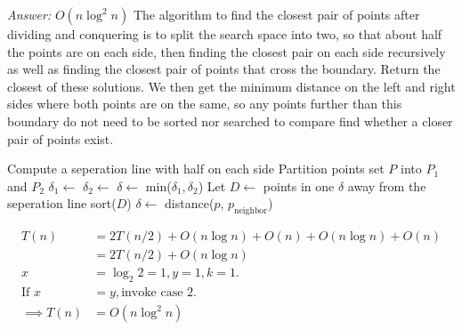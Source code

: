 \documentclass[12pt]{article}
\begin{document}
\textit{Answer:} $O(n \log^2 n)$
\newpage
The algorithm to find the closest pair of points after dividing and conquering is to split the search space into two, so that about half the points are on each side, then finding the closest pair on each side recursively as well as finding the closest pair of points that cross the boundary. Return the closest of these solutions. We then get the minimum distance on the left and right sides where both points are on the same, so any points further than this boundary do not need to be sorted nor searched to compare find whether a closer pair of points exist.
\begin{algorithmic}
        \State Compute a seperation line with half on each side 
        \State Partition points set $P$ into $P_1$ and $P_2$ 
        \State $\delta_1 \gets$  
        \State $\delta_2 \gets$  
        \State $\delta \gets $ min($\delta_1,\delta_2$)
        \State Let $D \gets$ points in one $\delta$ away from the seperation line 
        \State sort($D$) 
         
                \State $\delta \gets $ distance($p$, $p_{\text{neighbor}}$)
            \EndIf
        \EndFor
    \EndProcedure
\end{algorithmic}
\begin{align*}
T(n)&=2T(n/2)+O(n\log n)+O(n)+O(n\log n)+O(n) \\
&=2T(n/2)+O(n\log n) \\
x&=\log_2 2 = 1, y = 1, k=1. \\
\text{If } x&=y, \text{invoke case 2.}\\
\implies T(n) &= O(n \log ^2 n)
\end{align*}
\end{document}

